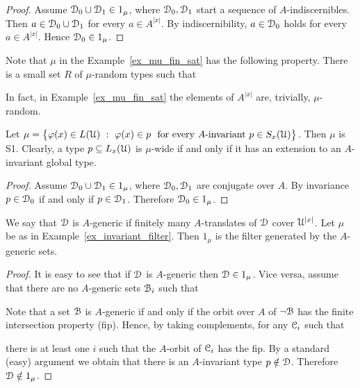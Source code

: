 \documentclass{amsproc}
\begin{document}
\begin{proof} 
  Assume $\EuScript D_0\cup\EuScript D_1\in1_\mu$, where $\EuScript D_0,\EuScript D_1$ start a sequence of $A$-indiscernibles.
  Then $a\in\EuScript D_0\cup\EuScript D_1$ for every $a\in A^{|x|}$.
  By indiscernibility, $a\in\EuScript D_0$ holds for every $a\in A^{|x|}$.
  Hence $\EuScript D_0\in1_\mu$.
\end{proof}

\begin{remark}
  Note that $\mu$ in the Example~\ref{ex_mu_fin_sat} has the following property.
  There is a small set $R$ of $\mu$-random types such that 
  
  
  In fact, in Example~\ref{ex_mu_fin_sat} the elements of $A^{|x|}$ are, trivially, $\mu$-random.
\end{remark}

\begin{example}\label{ex_invariant_filter}
  Let $\mu=\big\{\varphi(x)\in L(\EuScript U)\ :\ \varphi(x)\in p\ {\rm\ for\ every\ } A\textrm{-invariant}\ p\in S_x(\EuScript U) \big\}$.
  Then $\mu$ is S1.
  Clearly, a type $p\subseteq L_x(\EuScript U)$ is $\mu$-wide if and only if it has an extension to an $A$-invariant global type.
\end{example}

\begin{proof}
  Assume $\EuScript D_0\cup\EuScript D_1\in1_\mu$, where $\EuScript D_0,\EuScript D_1$ are conjugate over $A$.
  By invariance $p\in\EuScript D_0$ if and only if $p\in\EuScript D_1$. Therefore $\EuScript D_0\in1_\mu$.
\end{proof}

\begin{example}
  We say that $\EuScript D$ is $A$-generic if finitely many $A$-translates of $\EuScript D$ cover $\EuScript U^{|x|}$.
  Let $\mu$ be as in Example~\ref{ex_invariant_filter}.
  Then $1_\mu$ is the filter generated by the $A$-generic sets.
\end{example}
  
\begin{proof}
  It is easy to see that if $\EuScript D$ is $A$-generic then $\EuScript D\in1_\mu$.
  Vice versa, assume that there are no $A$-generic sets $\EuScript B_i$ such that 


  Note that a set $\EuScript B$ is $A$-generic if and only if the orbit over $A$ of $\neg\EuScript B$ has the finite intersection property (fip).
  Hence, by taking complements, for any $\EuScript C_i$ such that 
  

  there is at least one $i$ such that the $A$-orbit of $\EuScript C_i$ has the fip.
  By a standard (easy) argument we obtain that there is an $A$-invariant type $p\notin\EuScript D$.
  Therefore $\EuScript D\notin1_\mu$.
\end{proof}
\end{document}
